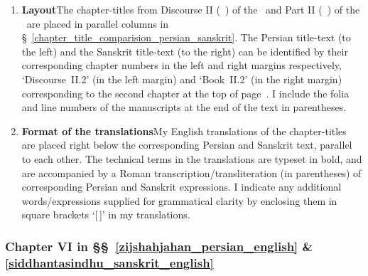 \begin{enumerate}[topsep=0pt]
    \item \textbf{Layout}\quad The chapter-titles from Discourse II (\maqala\idafaconsonant\ \duvum) of the \ZijiShahJahani\ and Part II (\dvitiya\ \kanda) of the \Siddhantasindhu\ are placed in parallel columns in \S~\ref{chapter_title_comparision_persian_sanskrit}. The Persian title-text (to the left) and the Sanskrit title-text (to the right) can be identified by their corresponding chapter numbers in the left and right margins respectively, \eg `Discourse~II.2' (in the left margin) and `Book~II.2' (in the right margin) corresponding to the second chapter at the top of page~\pageref{chapter_number_example}. 
    I include the folia and line numbers of the 
    manuscripts at the end of the text in parentheses. 
    
    \item \textbf{Format of the translations}\quad My English translations of the chapter-titles are placed right below the corresponding Persian and Sanskrit text, parallel to each other. The technical terms in the translations are typeset in bold, and are accompanied by a Roman transcription/transliteration (in parentheses) of corresponding Persian and Sanskrit expressions. I indicate any additional words/expressions supplied for grammatical clarity by enclosing them in square brackets `[\,]' in my translations.
\end{enumerate}

\subsubsection{Chapter VI in \S\S~\ref{zijshahjahan_persian_english} \& \ref{siddhantasindhu_sanskrit_english}}\label{chapter_vi_zij_sindhu}

